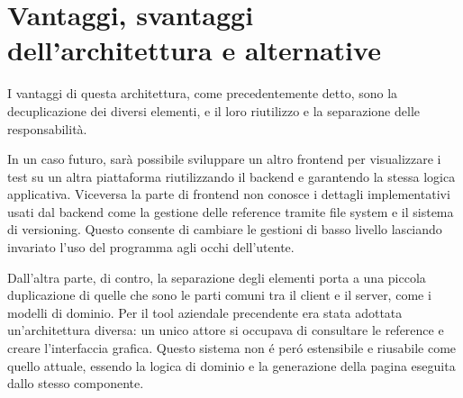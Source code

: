    \section{Vantaggi, svantaggi dell'architettura e alternative}
        I vantaggi di questa architettura, come precedentemente detto, sono la decuplicazione dei diversi elementi, e il loro riutilizzo e la separazione delle responsabilità.
        
        In un caso futuro, sarà possibile sviluppare un altro frontend per visualizzare i test su un altra piattaforma riutilizzando il backend e garantendo la stessa logica applicativa.
        Viceversa la parte di frontend non conosce i dettagli implementativi usati dal backend come la gestione delle reference tramite file system e il sistema di versioning.
        Questo consente di cambiare le gestioni di basso livello lasciando invariato l'uso del programma agli occhi dell'utente.  
        
        Dall'altra parte, di contro, la separazione degli elementi porta a una piccola duplicazione di quelle che sono le parti comuni tra il client e il server, come i modelli di dominio.
        Per il tool aziendale precendente era stata adottata un'architettura diversa: un unico attore si occupava di consultare le reference e creare l'interfaccia grafica. 
        Questo sistema non \'e per\'o estensibile e riusabile come quello attuale, essendo la logica di dominio e la generazione della pagina eseguita dallo stesso componente.
